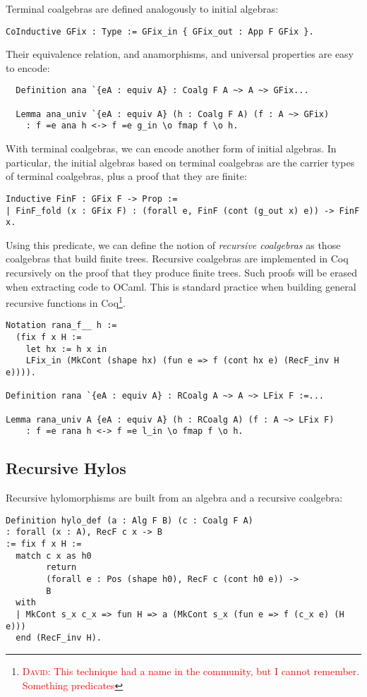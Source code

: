 \documentclass[a4paper, UKenglish, cleveref, autoref, thm-restate]{lipics-v2021}
\newcommand{\dcas}[1]{\textcolor{red}{\textsc{David}: #1}}
\begin{document}
Terminal coalgebras are defined analogously to initial algebras:
\begin{verbatim}
CoInductive GFix : Type := GFix_in { GFix_out : App F GFix }.
\end{verbatim}

Their equivalence relation, and anamorphisms, and universal properties are
easy to encode:
\begin{verbatim}
  Definition ana `{eA : equiv A} : Coalg F A ~> A ~> GFix...

  Lemma ana_univ `{eA : equiv A} (h : Coalg F A) (f : A ~> GFix)
    : f =e ana h <-> f =e g_in \o fmap f \o h.
\end{verbatim}

With terminal coalgebras, we can encode another form of initial algebras. In
particular, the initial algebras based on terminal coalgebras are the carrier
types of terminal coalgebras, plus a proof that they are finite:

\begin{verbatim}
Inductive FinF : GFix F -> Prop :=
| FinF_fold (x : GFix F) : (forall e, FinF (cont (g_out x) e)) -> FinF x.
\end{verbatim}

Using this predicate, we can define the notion of \emph{recursive coalgebras}
as those coalgebras that build finite trees. Recursive coalgebras are
implemented in Coq recursively on the proof that they produce finite trees.
Such proofs will be erased when extracting code to OCaml. This is standard
practice when building general recursive functions in Coq\footnote{\dcas{This
technique had a name in the community, but I cannot remember. Something
predicates}}.
\begin{verbatim}
Notation rana_f__ h :=
  (fix f x H :=
    let hx := h x in
    LFix_in (MkCont (shape hx) (fun e => f (cont hx e) (RecF_inv H e)))).

Definition rana `{eA : equiv A} : RCoalg A ~> A ~> LFix F :=...

Lemma rana_univ A {eA : equiv A} (h : RCoalg A) (f : A ~> LFix F)
    : f =e rana h <-> f =e l_in \o fmap f \o h.
\end{verbatim}

\subsection{Recursive Hylos}

Recursive hylomorphisms are built from an algebra and a recursive coalgebra:
\begin{verbatim}
Definition hylo_def (a : Alg F B) (c : Coalg F A)
: forall (x : A), RecF c x -> B
:= fix f x H :=
  match c x as h0
        return
        (forall e : Pos (shape h0), RecF c (cont h0 e)) ->
        B
  with
  | MkCont s_x c_x => fun H => a (MkCont s_x (fun e => f (c_x e) (H e)))
  end (RecF_inv H).
\end{verbatim}
\end{document}
